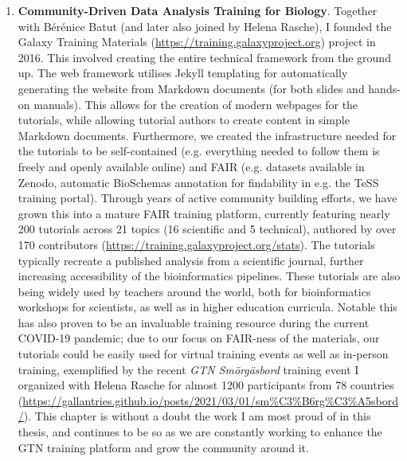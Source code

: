 \begin{enumerate}[label=\ref{chapter:training}.\arabic*]
\itemsep-0.5em
\setcounter{enumi}{-1}
\item \textbf{Community-Driven Data Analysis Training for Biology}. Together with Bérénice Batut (and later also joined by Helena Rasche), I founded the Galaxy Training Materials (\url{https://training.galaxyproject.org}) project in 2016. This involved creating the entire technical framework from the ground up. The web framework utilises Jekyll templating for automatically generating the website from Markdown documents (for both slides and hands-on manuals). This allows for the creation of modern webpages for the tutorials, while allowing tutorial authors to create content in simple Markdown documents. Furthermore, we created the infrastructure needed for the tutorials to be self-contained (e.g. everything needed to follow them is freely and openly available online) and FAIR (e.g. datasets available in Zenodo, automatic BioSchemas annotation for findability in e.g. the TeSS training portal). Through years of active community building efforts, we have grown this into a mature FAIR training platform, currently featuring nearly 200 tutorials across 21 topics (16 scientific and 5 technical), authored by over 170 contributors (\url{https://training.galaxyproject.org/stats}). The tutorials typically recreate a published analysis from a scientific journal, further increasing accessibility of the bioinformatics pipelines. These tutorials are also being widely used by teachers around the world, both for bioinformatics workshops for scientists, as well as in higher education curricula. Notable this has also proven to be an invaluable training resource during the current COVID-19 pandemic; due to our focus on FAIR-ness of the materials, our tutorials could be easily used for virtual training events as well as in-person training, exemplified by the recent \emph{GTN Smörgäsbord} training event I organized with Helena Rasche for almost 1200 participants from 78 countries (\url{https://gallantries.github.io/posts/2021/03/01/sm\%C3\%B6rg\%C3\%A5sbord/}). This chapter is without a doubt the work I am most proud of in this thesis, and continues to be so as we are constantly working to enhance the GTN training platform and grow the community around it.
\end{enumerate}
